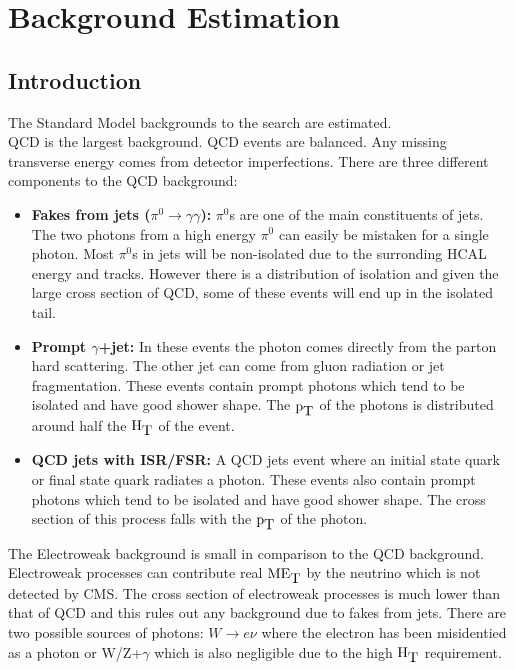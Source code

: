 \chapter{Background Estimation}

\section{Introduction}

The Standard Model backgrounds to the search are estimated. \\

QCD is the largest background. QCD events are balanced. Any missing transverse
energy comes from detector imperfections. There are three different components 
to the QCD background:

\begin{itemize}
\item {\bf Fakes from jets ($\pi^{0}\rightarrow\gamma\gamma$):} $\pi^{0}$s are
one of the main constituents of jets. The two photons from a high energy 
$\pi^{0}$ can easily be mistaken for a single photon. Most $\pi^{0}$s in jets
will be non-isolated due to the surronding HCAL energy and tracks. However
there is a distribution of isolation and given the large cross section of QCD, 
some of these events will end up in the isolated tail.
\item {\bf Prompt $\gamma$+jet:} In these events the photon comes directly from
the parton hard scattering. The other jet can come from gluon radiation or
jet fragmentation. These events contain prompt photons which tend to be isolated
and have good shower shape. The $\mbox{p}_{\mbox{T}}$ of the photons is distributed around half
the $\mbox{H}_{\mbox{T}}$ of the event.
\item {\bf QCD jets with ISR/FSR:} A QCD jets event where an initial state quark
or final state quark radiates a photon. These events also contain prompt photons
which tend to be isolated and have good shower shape. The cross section of this 
process falls with the $\mbox{p}_{\mbox{T}}$ of the photon. 
\end{itemize}

The Electroweak background is small in comparison to the QCD background.
Electroweak processes can contribute real $\mbox{ME}_{\mbox{T}}$ by the neutrino which is not
detected by CMS. The cross section of electroweak processes is much lower than
that of QCD and this rules out any background due to fakes from jets. There are
two possible sources of photons: $W\rightarrow e\nu$ where the electron has been
misidentied as a photon or W/Z+$\gamma$ which is also negligible due to the high
$\mbox{H}_{\mbox{T}}$ requirement. \\

